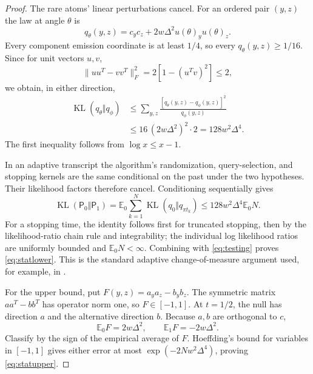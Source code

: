 \documentclass[11pt]{article}
\theoremstyle{remark}\newtheorem{remark}[theorem]{Remark}
\newcommand{\KL}{\operatorname{KL}}
\begin{document}
\begin{proof}
The rare atoms' linear perturbations cancel. For an ordered pair $(y,z)$ the law at angle $\theta$ is
\begin{equation}\label{eq:q2}
 q_\theta(y,z)=c_yc_z+2w\Delta^2u(\theta)_yu(\theta)_z.
\end{equation}
Every component emission coordinate is at least $1/4$, so every $q_\theta(y,z)\geq1/16$. Since for unit vectors $u,v$,
\[
 \|uu^T-vv^T\|_F^2=2[1-(u^Tv)^2]\leq2,
\]
we obtain, in either direction,
\begin{align*}
 \KL(q_\theta\Vert q_\phi)
 &\leq\sum_{y,z}\frac{[q_\theta(y,z)-q_\phi(y,z)]^2}{q_\phi(y,z)}\\
 &\leq16\,(2w\Delta^2)^2\cdot2
 =128w^2\Delta^4.
\end{align*}
The first inequality follows from $\log x\leq x-1$.

In an adaptive transcript the algorithm's randomization, query-selection, and stopping kernels are the same conditional on the past under the two hypotheses. Their likelihood factors therefore cancel. Conditioning sequentially gives
\[
 \KL(\mathsf P_0\Vert\mathsf P_1)
 =\mathbb E_0\sum_{k=1}^{N}\KL(q_0\Vert q_{\pi t_k})
 \leq128w^2\Delta^4\mathbb E_0N.
\]
For a stopping time, the identity follows first for truncated stopping, then by the likelihood-ratio chain rule and integrability; the individual log likelihood ratios are uniformly bounded and $\mathbb E_0N<\infty$. Combining with \eqref{eq:testing} proves \eqref{eq:statlower}. This is the standard adaptive change-of-measure argument used, for example, in \cite{KCG}.

For the upper bound, put $F(y,z)=a_ya_z-b_yb_z$. The symmetric matrix $aa^T-bb^T$ has operator norm one, so $F\in[-1,1]$. At $t=1/2$, the null has direction $a$ and the alternative direction $b$. Because $a,b$ are orthogonal to $c$,
\[
 \mathbb E_0F=2w\Delta^2,\qquad \mathbb E_1F=-2w\Delta^2.
\]
Classify by the sign of the empirical average of $F$. Hoeffding's bound for variables in $[-1,1]$ gives either error at most $\exp(-2Nw^2\Delta^4)$, proving \eqref{eq:statupper}.
\end{proof}
\end{document}
